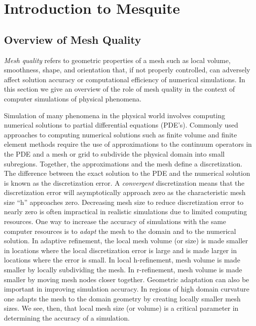 \chapter{Introduction to Mesquite} \label{sec:intro}

\section{Overview of Mesh Quality}

\hskip 0.25in {\it Mesh quality} refers to geometric properties of a mesh such as 
local volume, smoothness, shape, and orientation that, if not properly 
controlled, 
can adversely affect solution accuracy or computational efficiency of numerical simulations. In this section we give an overview of the role of mesh quality 
in the context of computer simulations of physical phenomena. \newline

Simulation of many phenomena in the physical world involves computing 
numerical 
solutions to partial differential equations (PDE's). Commonly used approaches 
to computing  numerical solutions such as finite volume and finite 
element methods require the use of approximations to the continuum operators 
in the PDE and a mesh or grid to subdivide the physical domain into small 
subregions. Together, the approximations and the mesh define a discretization. 
The difference between the exact solution to the PDE and the numerical solution is known as the discretization error. A {\it convergent} 
discretization means that the discretization error will asymptotically 
approach zero as the characteristic mesh size ``h'' 
approaches zero. Decreasing mesh size to reduce discretization error to 
nearly zero is often impractical in realistic simulations due to limited 
computing resources. One way to increase the accuracy of simulations with the 
same computer resources is to {\it adapt} the mesh to the domain and to the 
numerical solution. In adaptive refinement, the local mesh volume (or size) 
is made smaller in locations where the local discretization error is large and 
is made larger in locations where the error is small. In local h-refinement, 
mesh volume is made smaller by locally subdividing the mesh. In 
r-refinement, mesh volume is made smaller by moving mesh nodes closer together.
Geometric adaptation can also be important in improving simulation accuracy. In regions of high domain curvature one adapts the mesh to the domain geometry by creating locally smaller mesh sizes. We see, then, that local mesh size (or volume) is a critical parameter in determining the accuracy of a simulation. \newline

